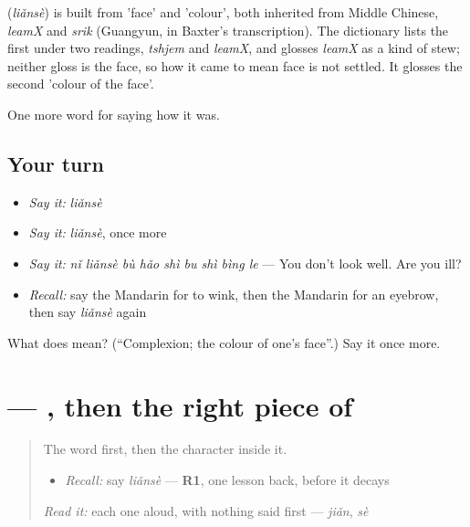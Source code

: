 \begin{cousinweb}
\textbf{} (\emph{liǎnsè}) is built from  'face' and  'colour', both inherited from Middle Chinese, \emph{leamX} and \emph{srik} (Guangyun, in Baxter's transcription). The dictionary lists the first under two readings, \emph{tshjem} and \emph{leamX}, and glosses \emph{leamX} as a kind of stew; neither gloss is the face, so how it came to mean face is not settled. It glosses the second 'colour of the face'.
\end{cousinweb}

\begin{grammarlens}[title={What you've built}]
One more word for saying how it was.
\end{grammarlens}

\subsection*{Your turn}
\begin{itemize}
\raggedright
  \item \emph{Say it:} \emph{liǎnsè}
  \item \emph{Say it:} \emph{liǎnsè}, once more
  \item \emph{Say it:} \emph{nǐ liǎnsè bù hǎo shì bu shì bìng le} — You don't look well. Are you ill?
  \item \emph{Recall:} say the Mandarin for to wink, then the Mandarin for an eyebrow, then say \emph{liǎnsè} again
\end{itemize}

\begin{tcolorbox}[breakable,colback=teal!4,colframe=teal!35!black,title={Before you move on}]
What does  mean? (\textquotedblleft{}Complexion; the colour of one's face\textquotedblright{}.) Say it once more.
\end{tcolorbox}
\section[\texorpdfstring{\zh{脸} (liǎn)}{脸 (liǎn)}]{ — , then the right piece of }

\label{lesson:ZH-W472-lian-face}



\begin{quote}
The word first, then the character inside it.

\begin{itemize}
\raggedright
  \item \emph{Recall:} say \emph{liǎnsè} — \textbf{R1}, one lesson back, before it decays
\end{itemize}

\begin{quote}
 
\end{quote}

\emph{Read it:} each one aloud, with nothing said first — \emph{jiǎn}, \emph{sè}
\end{quote}

